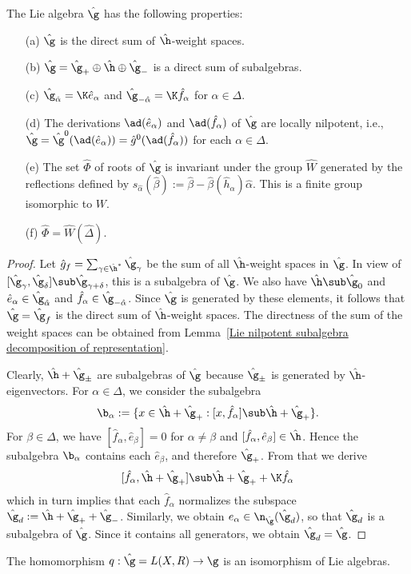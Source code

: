 \begin{lemma}\label{Lie algebra generated by Serre relation prop}
The Lie algebra $\hat{\g}$ has the following properties:
\begin{itemize}
\item[(a)] $\hat{\g}$ is the direct sum of $\hat{\h}$-weight spaces.
\item[(b)] $\hat{\g}=\hat{\g}_+\oplus\hat{\h}\oplus\hat{\g}_-$ is a direct sum of subalgebras.
\item[(c)] $\hat{\g}_{\hat{\alpha}}=\K\hat{e}_\alpha$ and $\hat{\g}_{-\hat{\alpha}}=\K\hat{f}_\alpha$ for $\alpha\in\Delta$.
\item[(d)] The derivations $\ad(\hat{e}_\alpha)$ and $\ad(\hat{f}_\alpha)$ of $\hat{\g}$ are locally nilpotent, i.e., $\hat{\g}=\hat{\g}^0(\ad(\hat{e}_\alpha))=\hat{g}^0(\ad(\hat{f}_\alpha))$ for each $\alpha\in\Delta$.
\item[(e)] The set $\hat{\Phi}$ of roots of $\hat{\g}$ is invariant under the group $\hat{W}$ generated by the reflections defined by $s_{\hat{\alpha}}(\hat{\beta}):=\hat{\beta}-\hat{\beta}(\hat{h}_\alpha)\hat{\alpha}$. This is a finite group isomorphic to $W$.
\item[(f)] $\hat{\Phi}=\hat{W}(\hat{\Delta})$.
\end{itemize}
\end{lemma}
\begin{proof}
Let $\hat{g}_f=\sum_{\gamma\in\hat{\h}^*}\hat{\g}_\gamma$ be the sum of all $\hat{\h}$-weight spaces in $\hat{\g}$. In view of $[\hat{\g}_\gamma,\hat{\g}_\delta]\sub\hat{\g}_{\gamma+\delta}$, this is a subalgebra of $\hat{\g}$. We also have $\hat{\h}\sub\hat{\g}_0$ and $\hat{e}_\alpha\in\hat{\g}_{\hat{\alpha}}$ and $\hat{f}_\alpha\in\hat{\g}_{-\hat{\alpha}}$. Since $\hat{\g}$ is generated by these elements, it follows that $\hat{\g}=\hat{\g}_f$ is the direct sum of $\hat{\h}$-weight spaces. The directness of the sum of the weight spaces can be obtained from Lemma~\ref{Lie nilpotent subalgebra decomposition of representation}.\par
Clearly, $\hat{\h}+\hat{\g}_\pm$ are subalgebras of $\hat{\g}$
because $\hat{\g}_\pm$ is generated by $\hat{\h}$-eigenvectors. For $\alpha\in\Delta$, we consider the subalgebra
\[\b_\alpha:=\{x\in\hat{\h}+\hat{\g}_+:[x,\hat{f}_\alpha]\sub\hat{\h}+\hat{\g}_+\}.\]
For $\beta\in\Delta$, we have $[\hat{f}_\alpha,\hat{e}_\beta]=0$ for $\alpha\neq\beta$ and $[\hat{f}_\alpha,\hat{e}_\beta]\in\hat{\h}$. Hence the subalgebra $\b_\alpha$ contains each $\hat{e}_\beta$, and therefore $\hat{\g}_+$. From that we derive
\[[\hat{f}_\alpha,\hat{\h}+\hat{\g}_+]\sub\hat{\h}+\hat{\g}_++\K\hat{f}_\alpha\]
which in turn implies that each $\hat{f}_\alpha$ normalizes the subspace $\hat{\g}_d:=\hat{\h}+\hat{\g}_++\hat{\g}_-$. Similarly, we obtain $e_\alpha\in\n_{\hat{\g}}(\hat{\g}_d)$, so that $\hat{\g}_d$ is a subalgebra of $\hat{\g}$. Since it contains all generators, we obtain $\hat{\g}_d=\hat{\g}$.
\end{proof}
\begin{theorem}
The homomorphism $q:\hat{\g}=L(X,R)\to\g$ is an isomorphism of Lie algebras.
\end{theorem}
